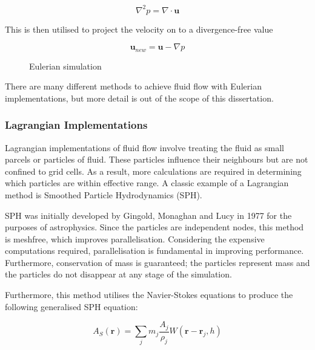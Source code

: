 \documentclass[12pt]{article}
\newcommand{\wideimage}[2][]{%
  \makebox[\textwidth][c]{\texttt{[image: \#2]}}%
}
\begin{document}
    \begin{equation}
        \nabla^2{p} = \nabla \cdot \textbf{u}
    \end{equation} 
    
    This is then utilised to project the velocity on to a divergence-free value
    
    \begin{equation}
        \textbf{u}_{new} = \textbf{u} - \nabla{p}
    \end{equation}

    \begin{figure}[H]
        \begin{center}
            \noindent\wideimage[width=0.7\textwidth]{eulerianEG.png}
        \end{center}
        \caption{Eulerian simulation \cite{eulerianeg}}
    \end{figure}

    There are many different methods to achieve fluid flow with Eulerian implementations, but more detail is out of the scope of this dissertation.

    \subsubsection{Lagrangian Implementations}

    Lagrangian implementations of fluid flow involve treating the fluid as small parcels or particles of fluid. These particles influence their neighbours but are not confined to grid cells. As a result, more calculations are required in determining which particles are within effective range. A classic example of a Lagrangian method is Smoothed Particle Hydrodynamics (SPH).

    SPH was initially developed by Gingold, Monaghan and Lucy in 1977 for the purposes of astrophysics\cite{sca}. Since the particles are independent nodes, this method is meshfree, which improves parallelisation. Considering the expensive computations required, parallelisation is fundamental in improving performance. Furthermore, conservation of mass is guaranteed; the particles represent mass and the particles do not disappear at any stage of the simulation.

    Furthermore, this method utilises the Navier-Stokes equations to produce the following generalised SPH equation:

    \begin{equation}
        A_S(\textbf{r}) = \sum_{j}{m_j \frac{A_j}{\rho_j}W(\textbf{r} - \textbf{r}_j, h)}
    \end{equation}
\end{document}
